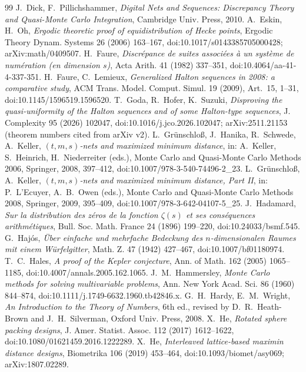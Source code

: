 \documentclass[11pt]{amsart}
\theoremstyle{definition}
\theoremstyle{plain}
\begin{document}
\begin{thebibliography}{99}
 J.~Dick, F.~Pillichshammer, \emph{Digital Nets and Sequences: Discrepancy Theory and Quasi-Monte Carlo Integration}, Cambridge Univ. Press, 2010.
 A.~Eskin, H.~Oh, \emph{Ergodic theoretic proof of equidistribution of Hecke points}, Ergodic Theory Dynam. Systems 26 (2006) 163--167, doi:10.1017/s0143385705000428; arXiv:math/0409507.
 H.~Faure, \emph{Discr\'epance de suites associ\'ees \`a un syst\`eme de num\'eration (en dimension $s$)}, Acta Arith. 41 (1982) 337--351, doi:10.4064/aa-41-4-337-351.
 H.~Faure, C.~Lemieux, \emph{Generalized Halton sequences in 2008: a comparative study}, ACM Trans. Model. Comput. Simul. 19 (2009), Art.~15, 1--31, doi:10.1145/1596519.1596520.
 T.~Goda, R.~Hofer, K.~Suzuki, \emph{Disproving the quasi-uniformity of the Halton sequences and of some Halton-type sequences}, J. Complexity 95 (2026) 102047, doi:10.1016/j.jco.2026.102047; arXiv:2511.21153 (theorem numbers cited from arXiv v2).
 L.~Gr\"unschlo{\ss}, J.~Hanika, R.~Schwede, A.~Keller, \emph{$(t,m,s)$-nets and maximized minimum distance}, in: A.~Keller, S.~Heinrich, H.~Niederreiter (eds.), Monte Carlo and Quasi-Monte Carlo Methods 2006, Springer, 2008, 397--412, doi:10.1007/978-3-540-74496-2\_23.
 L.~Gr\"unschlo{\ss}, A.~Keller, \emph{$(t,m,s)$-nets and maximized minimum distance, Part II}, in: P.~L'Ecuyer, A.~B.~Owen (eds.), Monte Carlo and Quasi-Monte Carlo Methods 2008, Springer, 2009, 395--409, doi:10.1007/978-3-642-04107-5\_25.
 J.~Hadamard, \emph{Sur la distribution des z\'eros de la fonction $\zeta(s)$ et ses cons\'equences arithm\'etiques}, Bull. Soc. Math. France 24 (1896) 199--220, doi:10.24033/bsmf.545.
 G.~Haj\'os, \emph{\"Uber einfache und mehrfache Bedeckung des $n$-dimensionalen Raumes mit einem W\"urfelgitter}, Math. Z. 47 (1942) 427--467, doi:10.1007/bf01180974.
 T.~C.~Hales, \emph{A proof of the Kepler conjecture}, Ann. of Math. 162 (2005) 1065--1185, doi:10.4007/annals.2005.162.1065.
 J.~M.~Hammersley, \emph{Monte Carlo methods for solving multivariable problems}, Ann. New York Acad. Sci. 86 (1960) 844--874, doi:10.1111/j.1749-6632.1960.tb42846.x.
 G.~H.~Hardy, E.~M.~Wright, \emph{An Introduction to the Theory of Numbers}, 6th ed., revised by D.~R.~Heath-Brown and J.~H.~Silverman, Oxford Univ. Press, 2008.
 X.~He, \emph{Rotated sphere packing designs}, J. Amer. Statist. Assoc. 112 (2017) 1612--1622, doi:10.1080/01621459.2016.1222289.
 X.~He, \emph{Interleaved lattice-based maximin distance designs}, Biometrika 106 (2019) 453--464, doi:10.1093/biomet/asy069; arXiv:1807.02289.

\end{thebibliography}
\end{document}
